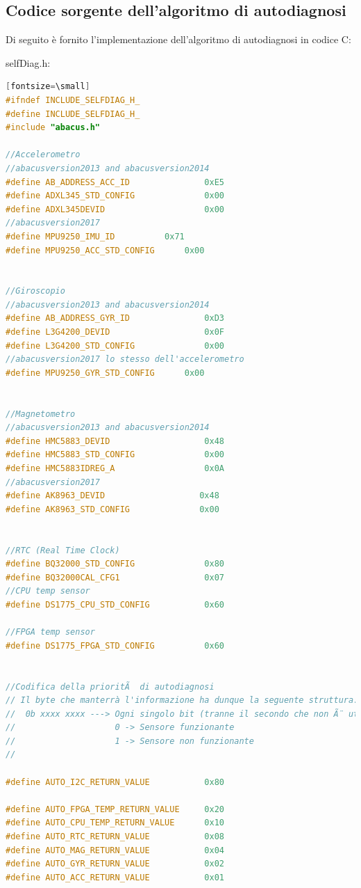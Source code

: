 \documentclass[LaM,binding=0.6cm]{../sapthesis}
\begin{document}
\clearpage
\subsection{Codice sorgente dell'algoritmo di autodiagnosi}
Di seguito è fornito l'implementazione dell'algoritmo di autodiagnosi in codice C:

selfDiag.h:
\begin{lstlisting}[language=c][fontsize=\small]
#ifndef INCLUDE_SELFDIAG_H_
#define INCLUDE_SELFDIAG_H_
#include "abacus.h"

//Accelerometro
//abacusversion2013 and abacusversion2014
#define AB_ADDRESS_ACC_ID               0xE5
#define ADXL345_STD_CONFIG              0x00
#define ADXL345DEVID                    0x00
//abacusversion2017
#define MPU9250_IMU_ID			0x71
#define MPU9250_ACC_STD_CONFIG		0x00	


//Giroscopio
//abacusversion2013 and abacusversion2014
#define AB_ADDRESS_GYR_ID               0xD3
#define L3G4200_DEVID                   0x0F
#define L3G4200_STD_CONFIG              0x00
//abacusversion2017 lo stesso dell'accelerometro
#define MPU9250_GYR_STD_CONFIG		0x00


//Magnetometro
//abacusversion2013 and abacusversion2014
#define HMC5883_DEVID                   0x48   
#define HMC5883_STD_CONFIG              0x00
#define HMC5883IDREG_A                  0x0A
//abacusversion2017
#define AK8963_DEVID                   0x48
#define AK8963_STD_CONFIG              0x00


//RTC (Real Time Clock)
#define BQ32000_STD_CONFIG              0x80
#define BQ32000CAL_CFG1                 0x07
//CPU temp sensor
#define DS1775_CPU_STD_CONFIG           0x60

//FPGA temp sensor
#define DS1775_FPGA_STD_CONFIG          0x60


//Codifica della prioritÃ  di autodiagnosi
// Il byte che manterrà l'informazione ha dunque la seguente struttura:
//  0b xxxx xxxx ---> Ogni singolo bit (tranne il secondo che non Ã¨ utilizzato) avrÃ  la seguente logica:
//                    0 -> Sensore funzionante
//                    1 -> Sensore non funzionante
//

#define AUTO_I2C_RETURN_VALUE           0x80

#define AUTO_FPGA_TEMP_RETURN_VALUE     0x20
#define AUTO_CPU_TEMP_RETURN_VALUE      0x10
#define AUTO_RTC_RETURN_VALUE           0x08
#define AUTO_MAG_RETURN_VALUE           0x04
#define AUTO_GYR_RETURN_VALUE           0x02
#define AUTO_ACC_RETURN_VALUE           0x01



\end{lstlisting}
\end{document}
